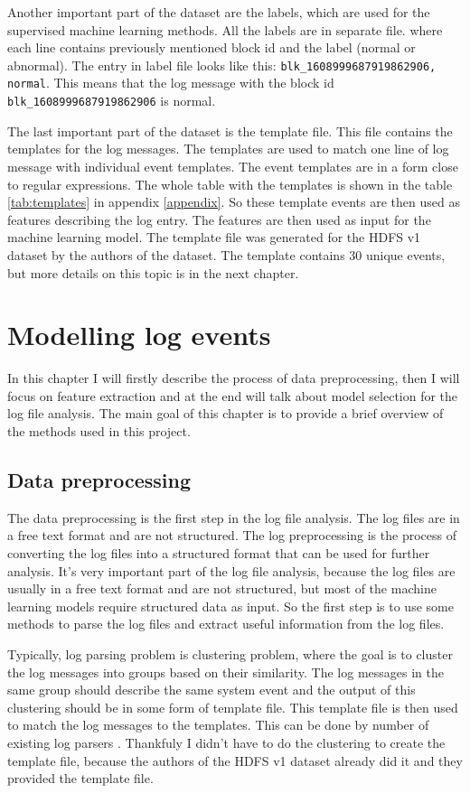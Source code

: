 Another important part of the dataset are the labels, which are used for the supervised machine learning methods. All the labels are in separate file. where each line contains previously mentioned block id and the label (normal or abnormal).
The entry in label file looks like this: \texttt{blk\_1608999687919862906, normal}. This means that the log message with the block id \texttt{blk\_1608999687919862906} is normal.

The last important part of the dataset is the template file. This file contains the templates for the log messages. The templates are used to match one line of log message with individual event templates. The event templates are in a form close to regular expressions.
The whole table with the templates is shown in the table \ref{tab:templates} in appendix \ref{appendix}. So these template events are then used as features describing the log entry. The features are then used as input for the machine learning model.
The template file was generated for the HDFS v1 dataset by the authors of the dataset. The template contains 30 unique events, but more details on this topic is in the next chapter.

\chapter{Modelling log events}
In this chapter I will firstly describe the process of data preprocessing, then I will focus on feature extraction and at the end will talk about model selection for the log file analysis. 
The main goal of this chapter is to provide a brief overview of the methods used in this project.


\section{Data preprocessing}
The data preprocessing is the first step in the log file analysis. The log files are in a free text format and are not structured. 
The log preprocessing is the process of converting the log files into a structured format that can be used for further analysis. It's very important part 
of the log file analysis, because the log files are usually in a free text format and are not structured, but most of the machine learning models require structured data as input.
So the first step is to use some methods to parse the log files and extract useful information from the log files. 

Typically, log parsing problem is clustering problem, where the goal is to cluster the log messages into groups based on their similarity. The log messages in the same group
should describe the same system event and the output of this clustering should be in some form of template file. This template file is then used to match the log messages to the templates. 
This can be done by number of existing log parsers \cite{goat}. %
Thankfuly I didn't have to do the clustering to create the template file, because the authors of the HDFS v1 dataset already did it and they provided the template file. 

